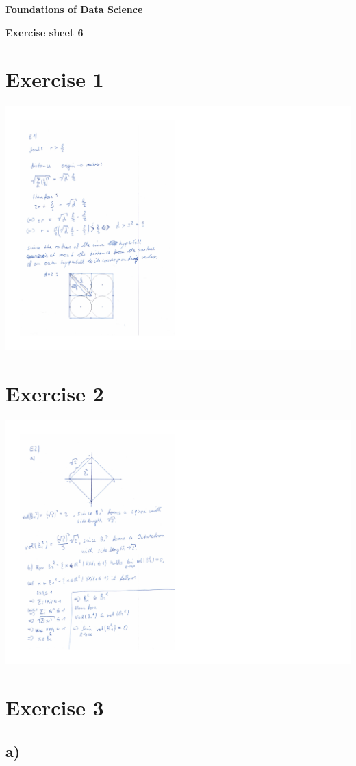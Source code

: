 \documentclass[a4paper,10pt]{article}
\begin{document}
\centerline{\Large\bfseries  Foundations of Data Science }
\centerline{\bfseries  Exercise sheet 6}
\section*{Exercise 1}
\includegraphics[scale=1]{E1.pdf}
\section*{Exercise 2}
\includegraphics[scale=1]{E2.pdf}

\section*{Exercise 3}
\subsection*{a)}
\end{document}
